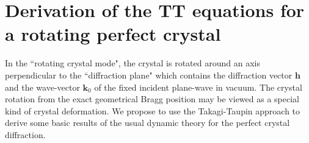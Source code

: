 \documentclass{iucr}
\begin{document}


\appendix

\section{Derivation of the TT equations for a rotating perfect crystal}
\label{appendix:rotating}

In the ``rotating crystal mode", the crystal is rotated around an axis perpendicular to the ``diffraction plane" which contains the diffraction vector $\textbf{h}$ and the wave-vector $\textbf{k}_0$ of the fixed incident plane-wave in vacuum. The crystal rotation from the exact geometrical Bragg position may be viewed as a special kind of crystal deformation. We propose to use the Takagi-Taupin approach to derive some basic results of the usual dynamic theory for the perfect crystal diffraction. 
\end{document}
